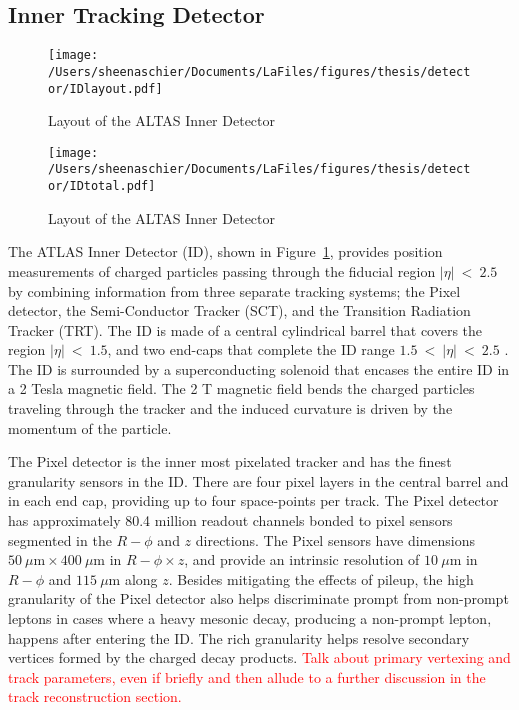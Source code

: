 \subsection{Inner Tracking Detector}
\label{sec:ID}
  \begin{figure}[tbp]
 \texttt{[image: /Users/sheenaschier/Documents/LaFiles/figures/thesis/detector/IDlayout.pdf]}
    \caption{Layout of the ALTAS Inner Detector}
   \label{fig:ID}
 \end{figure}
   \begin{figure}[tbp]
  \texttt{[image: /Users/sheenaschier/Documents/LaFiles/figures/thesis/detector/IDtotal.pdf]}
    \caption{Layout of the ALTAS Inner Detector}
   \label{fig:ID2}
 \end{figure}
The ATLAS Inner Detector (ID), shown in Figure~\ref{fig:ID}, provides position measurements of charged particles passing through the fiducial region $|\eta|~<~2.5$ by combining information from three separate tracking systems; the Pixel detector, the Semi-Conductor Tracker (SCT), and the Transition Radiation Tracker (TRT).  The ID is made of a central cylindrical barrel that covers the region $|\eta|~<~1.5$, and two end-caps that complete the ID range $1.5~<~|\eta|~<~2.5$ . The ID is surrounded by a superconducting solenoid that encases the entire ID in a 2 Tesla magnetic field.  The 2 T magnetic field bends the charged particles traveling through the tracker and the induced curvature is driven by the momentum of the particle. %
\iffalse
  \begin{figure}[tbp]
 \texttt{[image: /Users/sheenaschier/Documents/LaFiles/figures/thesis/detector/ID.pdf]}
  \texttt{[image: /Users/sheenaschier/Documents/LaFiles/figures/thesis/detector/IDendcap.pdf]}
    \caption{Layout of the ALTAS Inner Detector}
   \label{fig:IDscematic}
 \end{figure}
\fi

The Pixel detector is the inner most pixelated tracker and has the finest granularity sensors in the ID.  There are four pixel layers in the central barrel and in each end cap, providing up to four space-points per track.  The Pixel detector has approximately 80.4 million readout channels bonded to pixel sensors segmented in the $R-\phi$ and $z$ directions.  The Pixel sensors have dimensions $50~\mu \mathrm{m} \times 400~\mu \mathrm{m}$ in $R-\phi \times z$, and provide an intrinsic resolution of $10~\mu \mathrm{m}$ in $R-\phi$ and $115~\mu \mathrm{m}$ along $z$.  Besides mitigating the effects of pileup, the high granularity of the Pixel detector also helps discriminate prompt from non-prompt leptons in cases where a heavy mesonic decay, producing a non-prompt lepton, happens after entering the ID. The rich granularity helps resolve secondary vertices formed by the charged decay products.  \textcolor{red}{Talk about primary vertexing and track parameters, even if briefly and then allude to a further discussion in the track reconstruction section.}

